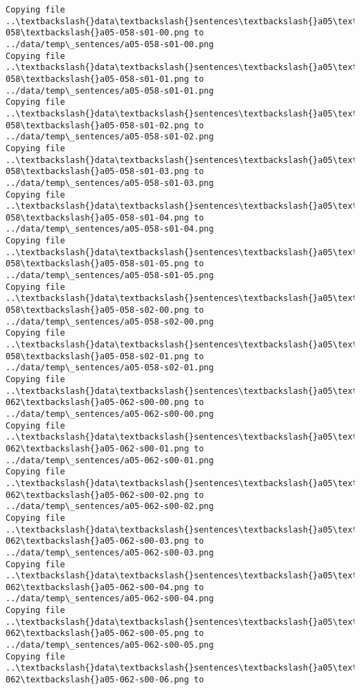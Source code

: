 \documentclass[11pt]{article}
\begin{document}
\begin{Verbatim}[commandchars=\\\{\}]
Copying file ..\textbackslash{}data\textbackslash{}sentences\textbackslash{}a05\textbackslash{}a05-058\textbackslash{}a05-058-s01-00.png to
../data/temp\_sentences/a05-058-s01-00.png
Copying file ..\textbackslash{}data\textbackslash{}sentences\textbackslash{}a05\textbackslash{}a05-058\textbackslash{}a05-058-s01-01.png to
../data/temp\_sentences/a05-058-s01-01.png
Copying file ..\textbackslash{}data\textbackslash{}sentences\textbackslash{}a05\textbackslash{}a05-058\textbackslash{}a05-058-s01-02.png to
../data/temp\_sentences/a05-058-s01-02.png
Copying file ..\textbackslash{}data\textbackslash{}sentences\textbackslash{}a05\textbackslash{}a05-058\textbackslash{}a05-058-s01-03.png to
../data/temp\_sentences/a05-058-s01-03.png
Copying file ..\textbackslash{}data\textbackslash{}sentences\textbackslash{}a05\textbackslash{}a05-058\textbackslash{}a05-058-s01-04.png to
../data/temp\_sentences/a05-058-s01-04.png
Copying file ..\textbackslash{}data\textbackslash{}sentences\textbackslash{}a05\textbackslash{}a05-058\textbackslash{}a05-058-s01-05.png to
../data/temp\_sentences/a05-058-s01-05.png
Copying file ..\textbackslash{}data\textbackslash{}sentences\textbackslash{}a05\textbackslash{}a05-058\textbackslash{}a05-058-s02-00.png to
../data/temp\_sentences/a05-058-s02-00.png
Copying file ..\textbackslash{}data\textbackslash{}sentences\textbackslash{}a05\textbackslash{}a05-058\textbackslash{}a05-058-s02-01.png to
../data/temp\_sentences/a05-058-s02-01.png
Copying file ..\textbackslash{}data\textbackslash{}sentences\textbackslash{}a05\textbackslash{}a05-062\textbackslash{}a05-062-s00-00.png to
../data/temp\_sentences/a05-062-s00-00.png
Copying file ..\textbackslash{}data\textbackslash{}sentences\textbackslash{}a05\textbackslash{}a05-062\textbackslash{}a05-062-s00-01.png to
../data/temp\_sentences/a05-062-s00-01.png
Copying file ..\textbackslash{}data\textbackslash{}sentences\textbackslash{}a05\textbackslash{}a05-062\textbackslash{}a05-062-s00-02.png to
../data/temp\_sentences/a05-062-s00-02.png
Copying file ..\textbackslash{}data\textbackslash{}sentences\textbackslash{}a05\textbackslash{}a05-062\textbackslash{}a05-062-s00-03.png to
../data/temp\_sentences/a05-062-s00-03.png
Copying file ..\textbackslash{}data\textbackslash{}sentences\textbackslash{}a05\textbackslash{}a05-062\textbackslash{}a05-062-s00-04.png to
../data/temp\_sentences/a05-062-s00-04.png
Copying file ..\textbackslash{}data\textbackslash{}sentences\textbackslash{}a05\textbackslash{}a05-062\textbackslash{}a05-062-s00-05.png to
../data/temp\_sentences/a05-062-s00-05.png
Copying file ..\textbackslash{}data\textbackslash{}sentences\textbackslash{}a05\textbackslash{}a05-062\textbackslash{}a05-062-s00-06.png to

\end{Verbatim}
\end{document}
